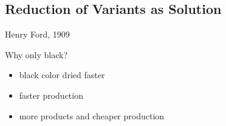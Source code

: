\subsection{Reduction of Variants as Solution}
\begin{frame}{\myframetitle}
	\begin{mycolumns}[forget]
	\mynextcolumn
		\begin{note}{Henry Ford, 1909}
		\end{note}
		\begin{example}{Why only black?\mysource{\fospl}}
			\begin{itemize}
				\item black color dried faster
				\item faster production
				\item more products and cheaper production
			\end{itemize}
		\end{example}
	\end{mycolumns}
\end{frame}

